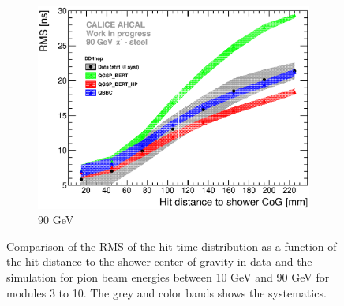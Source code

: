 \begin{figure}[htbp!]
\begin{subfigure}[t]{0.49\textwidth}
    \centering
    \includegraphics[width=1\textwidth]{../Thesis_Plots/Timing/Pions/Plots/ComparisonToSim/RMS_Radius_90GeV_SSF_DD4hep.eps}
    \caption{90 GeV}\label{fig:Radius_SSF_RMS_SimData_90GeV_DD4hep}
  \end{subfigure}
  \caption{Comparison of the RMS of the hit time distribution as a function of the hit distance to the shower center of gravity in data and the \ddhep simulation for pion beam energies between 10 GeV and 90 GeV for modules 3 to 10. The grey and color bands shows the systematics.}
  \label{fig:Radius_SSF_RMS_SimData_Comparison_DD4hep}
\end{figure}


